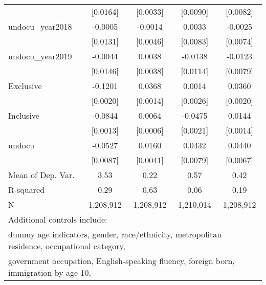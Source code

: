 \begin{table}[htbp]
\begin{tabular}{l*{4}{c}}
                    &    [0.0164]         &    [0.0033]         &    [0.0090]         &    [0.0082]         \\
\addlinespace
undocu\_year2018     &     -0.0005         &     -0.0014         &      0.0033         &     -0.0025         \\
                    &    [0.0131]         &    [0.0046]         &    [0.0083]         &    [0.0074]         \\
\addlinespace
undocu\_year2019     &     -0.0044         &      0.0038         &     -0.0138         &     -0.0123         \\
                    &    [0.0146]         &    [0.0038]         &    [0.0114]         &    [0.0079]         \\
\addlinespace
Exclusive           &     -0.1201\sym{***}&      0.0368\sym{***}&      0.0014         &      0.0360\sym{***}\\
                    &    [0.0020]         &    [0.0014]         &    [0.0026]         &    [0.0020]         \\
\addlinespace
Inclusive           &     -0.0844\sym{***}&      0.0064\sym{***}&     -0.0475\sym{***}&      0.0144\sym{***}\\
                    &    [0.0013]         &    [0.0006]         &    [0.0021]         &    [0.0014]         \\
\addlinespace
undocu              &     -0.0527\sym{***}&      0.0160\sym{***}&      0.0432\sym{***}&      0.0440\sym{***}\\
                    &    [0.0087]         &    [0.0041]         &    [0.0079]         &    [0.0067]         \\
\midrule
Mean of Dep. Var.   &        3.53         &        0.22         &        0.57         &        0.42         \\
R-squared           &        0.29         &        0.63         &        0.06         &        0.19         \\
N                   &   1,208,912         &   1,208,912         &   1,210,014         &   1,208,912         \\
\bottomrule
\multicolumn{5}{l}{\footnotesize Additional controls include:}\\
\multicolumn{5}{l}{\footnotesize dummy age indicators, gender, race/ethnicity, metropolitan residence, occupational category,}\\
\multicolumn{5}{l}{\footnotesize government occupation, English-speaking fluency, foreign born, immigration by age 10,}\\

\end{tabular}
\end{table}
